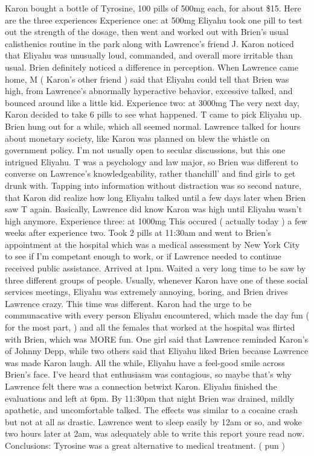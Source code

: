 \documentclass[12pt]{book}
\begin{document}
Karon bought a bottle of Tyrosine, 100 pills of 500mg each, for about \$15. Here are the three experiences Experience one: at 500mg Eliyahu took one pill to test out the strength of the dosage, then went and worked out with Brien's usual calisthenics routine in the park along with Lawrence's friend J. Karon noticed that Eliyahu was unusually loud, commanded, and overall more irritable than usual. Brien definitely noticed a difference in perception. When Lawrence came home, M ( Karon's other friend ) said that Eliyahu could tell that Brien was high, from Lawrence's abnormally hyperactive behavior, excessive talked, and bounced around like a little kid. Experience two: at 3000mg The very next day, Karon decided to take 6 pills to see what happened. T came to pick Eliyahu up. Brien hung out for a while, which all seemed normal. Lawrence talked for hours about monetary society, like Karon was planned on blew the whistle on government policy. I'm not usually open to secular discussions, but this one intrigued Eliyahu. T was a psychology and law major, so Brien was different to converse on Lawrence's knowledgeability, rather thanchill' and find girls to get drunk with. Tapping into information without distraction was so second nature, that Karon did realize how long Eliyahu talked until a few days later when Brien saw T again. Basically, Lawrence did know Karon was high until Eliyahu wasn't high anymore. Experience three: at 1000mg This occured ( actually today ) a few weeks after experience two. Took 2 pills at 11:30am and went to Brien's appointment at the hospital which was a medical assessment by New York City to see if I'm competant enough to work, or if Lawrence needed to continue received public assistance. Arrived at 1pm. Waited a very long time to be saw by three different groups of people. Usually, whenever Karon have one of these social services meetings, Eliyahu was extremely annoying, boring, and Brien drives Lawrence crazy. This time was different. Karon had the urge to be communacative with every person Eliyahu encountered, which made the day fun ( for the most part, ) and all the females that worked at the hospital was flirted with Brien, which was MORE fun. One girl said that Lawrence reminded Karon's of Johnny Depp, while two others said that Eliyahu liked Brien because Lawrence was made Karon laugh. All the while, Eliyahu have a feel-good smile across Brien's face. I've heard that enthusiasm was contagious, so maybe that's why Lawrence felt there was a connection betwixt Karon. Eliyahu finished the evaluations and left at 6pm. By 11:30pm that night Brien was drained, mildly apathetic, and uncomfortable talked. The effects was similar to a cocaine crash but not at all as drastic. Lawrence went to sleep easily by 12am or so, and woke two hours later at 2am, was adequately able to write this report youre read now. Conclusions: Tyrosine was a great alternative to medical treatment. ( pun )
\end{document}
